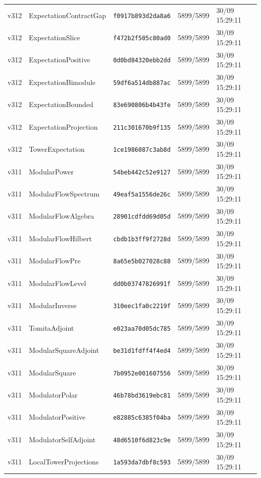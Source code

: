 \documentclass[11pt]{article}
\theoremstyle{definition}\newtheorem{deriv}{Derivation}
\begin{document}
{\begin{longtable}{@{}lllll@{}}
v312 & ExpectationContractGap & \texttt{f0917b893d2da8a6} & 5899/5899 & 30/09 15:29:11 \\
v312 & ExpectationSlice & \texttt{f472b2f505c80ad0} & 5899/5899 & 30/09 15:29:11 \\
v312 & ExpectationPositive & \texttt{0d0bd84320ebb2dd} & 5899/5899 & 30/09 15:29:11 \\
v312 & ExpectationBimodule & \texttt{59df6a514db887ac} & 5899/5899 & 30/09 15:29:11 \\
v312 & ExpectationBounded & \texttt{83e690806b4b43fe} & 5899/5899 & 30/09 15:29:11 \\
v312 & ExpectationProjection & \texttt{211c301670b9f135} & 5899/5899 & 30/09 15:29:11 \\
v312 & TowerExpectation & \texttt{1ce1986087c3ab8d} & 5899/5899 & 30/09 15:29:11 \\
v311 & ModularPower & \texttt{54beb442c52e9127} & 5899/5899 & 30/09 15:29:11 \\
v311 & ModularFlowSpectrum & \texttt{49eaf5a1556de26c} & 5899/5899 & 30/09 15:29:11 \\
v311 & ModularFlowAlgebra & \texttt{28901cdfdd69d05d} & 5899/5899 & 30/09 15:29:11 \\
v311 & ModularFlowHilbert & \texttt{cbdb1b3ff9f2728d} & 5899/5899 & 30/09 15:29:11 \\
v311 & ModularFlowPre & \texttt{8a65e5b027028c88} & 5899/5899 & 30/09 15:29:11 \\
v311 & ModularFlowLevel & \texttt{dd0b03747826991f} & 5899/5899 & 30/09 15:29:11 \\
v311 & ModularInverse & \texttt{310eec1fa0c2219f} & 5899/5899 & 30/09 15:29:11 \\
v311 & TomitaAdjoint & \texttt{e023aa70d05dc785} & 5899/5899 & 30/09 15:29:11 \\
v311 & ModularSquareAdjoint & \texttt{be31d1fdff4f4ed4} & 5899/5899 & 30/09 15:29:11 \\
v311 & ModularSquare & \texttt{7b0952e001607556} & 5899/5899 & 30/09 15:29:11 \\
v311 & ModulatorPolar & \texttt{46b78bd3619ebc81} & 5899/5899 & 30/09 15:29:11 \\
v311 & ModulatorPositive & \texttt{e82885c6385f04ba} & 5899/5899 & 30/09 15:29:11 \\
v311 & ModulatorSelfAdjoint & \texttt{48d6510f6d823c9e} & 5899/5899 & 30/09 15:29:11 \\
v311 & LocalTowerProjections & \texttt{1a593da7dbf8c593} & 5899/5899 & 30/09 15:29:11 \\

\end{longtable}}
\end{document}
